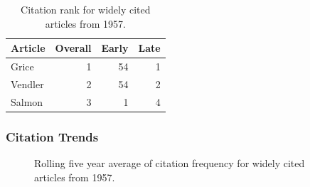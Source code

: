 \documentclass[
  10pt,
  letterpaper,
  DIV=11,
  numbers=noendperiod,
  twoside]{scrartcl}
\begin{document}
\begin{longtable}[]{@{}lrrr@{}}

\caption{\label{tbl-citation-rank-1957}Citation rank for widely cited
articles from 1957.}

\tabularnewline

\toprule\noalign{}
Article & Overall & Early & Late \\
\midrule\noalign{}
\endhead
\bottomrule\noalign{}
\endlastfoot
Grice & 1 & 54 & 1 \\
Vendler & 2 & 54 & 2 \\
Salmon & 3 & 1 & 4 \\

\end{longtable}

\subsubsection*{Citation Trends}\label{sec-trends-1957}

\begin{figure}


\caption{\label{fig-citation-spaghetti-1957}Rolling five year average of
citation frequency for widely cited articles from 1957.}

\end{figure}%
\end{document}
